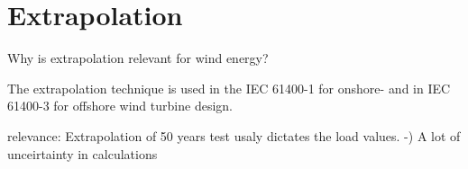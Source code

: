 \chapter{Extrapolation}



Why is extrapolation relevant for wind energy?

The extrapolation technique is used in the IEC 61400-1 for onshore- \cite{mathews2004} and in IEC 61400-3 \cite{mckay1979} for offshore wind turbine design.

relevance:
Extrapolation of 50 years test usaly dictates the load values.
-) A lot of unceirtainty in calculations

